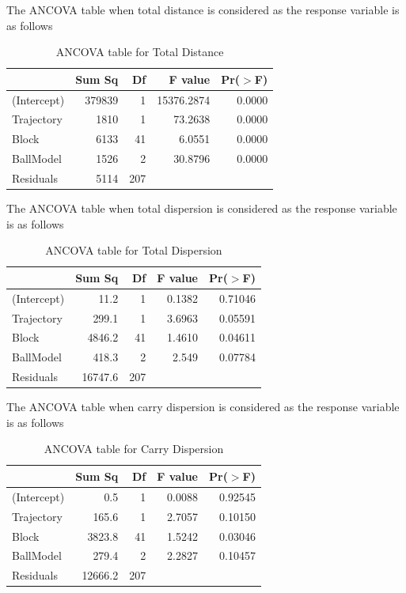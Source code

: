 \documentclass{article}\usepackage[]{graphicx}\usepackage[]{color}
\begin{document}
\newpage
{}

The ANCOVA table when total distance is considered as the response variable is as follows

\begin{table}[ht]
\centering
\begin{tabular}{|l|rrrr|}
  \hline
 & Sum Sq & Df & F value & Pr($>$F) \\ 
  \hline
(Intercept) & 379839 & 1 & 15376.2874 & 0.0000 \\ 
  Trajectory & 1810 & 1 & 73.2638 & 0.0000 \\ 
  Block & 6133 & 41 & 6.0551 & 0.0000 \\ 
  BallModel & 1526 & 2 & 30.8796 & 0.0000 \\ 
  Residuals & 5114 & 207 &  &  \\ 
   \hline
\end{tabular}
\caption{ANCOVA table for Total Distance}
\end{table}


The ANCOVA table when total dispersion is considered as the response variable is as follows




\begin{table}[ht]
\centering
\begin{tabular}{|l|rrrr|}
  \hline
 & Sum Sq & Df & F value & Pr($>$F) \\ 
  \hline
(Intercept) & 11.2 & 1 & 0.1382 & 0.71046 \\ 
  Trajectory & 299.1 & 1 & 3.6963 & 0.05591 \\ 
  Block & 4846.2 & 41 & 1.4610 & 0.04611 \\ 
  BallModel & 418.3 & 2 & 2.549 & 0.07784 \\ 
  Residuals & 16747.6 & 207 &  &  \\ 
   \hline
\end{tabular}
\caption{ANCOVA table for Total Dispersion}
\end{table}

The ANCOVA table when carry dispersion is considered as the response variable is as follows

\begin{table}[ht]
\centering
\begin{tabular}{|l|rrrr|}
  \hline
 & Sum Sq & Df & F value & Pr($>$F) \\ 
  \hline
(Intercept) & 0.5 & 1 & 0.0088 & 0.92545 \\ 
  Trajectory & 165.6 & 1 & 2.7057 & 0.10150 \\ 
  Block & 3823.8 & 41 & 1.5242 & 0.03046 \\ 
  BallModel & 279.4 & 2 & 2.2827 & 0.10457 \\ 
  Residuals & 12666.2 & 207 &  &  \\ 
   \hline
\end{tabular}
\caption{ANCOVA table for Carry Dispersion}
\end{table}
\end{document}
